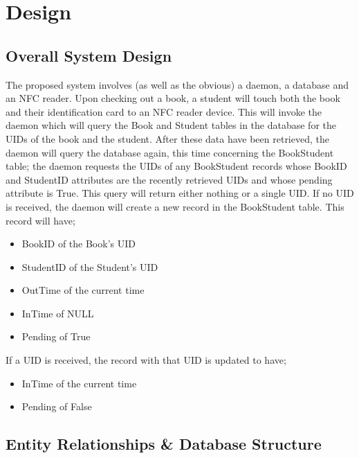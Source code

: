 \documentclass[draft]{book}
\begin{document}

\chapter{Design}

\section{Overall System Design}

The proposed system involves (as well as the obvious) a daemon, a database
and an NFC reader. Upon checking out a book, a student will touch both the
book and their identification card to an NFC reader device. This will invoke
the daemon which will query the Book and Student tables in the database for
the UIDs of the book and the student. After these data have been retrieved,
the daemon will query the database again, this time concerning the BookStudent
table; the daemon requests the UIDs of any BookStudent records whose BookID
and StudentID attributes are the recently retrieved UIDs and whose pending
attribute is True. This query will return either nothing or a single UID. If
no UID is received, the daemon will create a new record in the BookStudent
table. This record will have;\begin{itemize}

    \item BookID of the Book's UID
    \item StudentID of the Student's UID
    \item OutTime of the current time
    \item InTime of NULL
    \item Pending of True

\end{itemize} If a UID is received, the record with that UID is updated to
have;\begin{itemize}

    \item InTime of the current time
    \item Pending of False

\end{itemize}

\section{Entity Relationships \& Database Structure}
\end{document}

